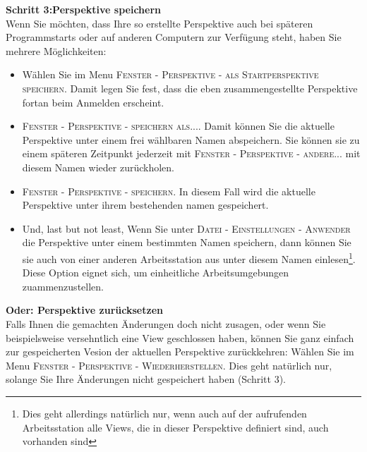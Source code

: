 \bigskip
\textbf{Schritt 3:Perspektive speichern}\\
Wenn Sie möchten, dass Ihre so erstellte Perspektive auch bei späteren Programmstarts oder auf anderen Computern zur Verfügung steht, haben Sie mehrere Möglichkeiten:
\begin{itemize}
\item Wählen Sie im Menu \textsc{Fenster - Perspektive - als Startperspektive speichern}. Damit legen Sie fest, dass die eben zusammengestellte Perspektive fortan beim Anmelden erscheint.
\item \textsc{Fenster - Perspektive - speichern als...}. Damit können Sie die aktuelle Perspektive unter einem frei wählbaren Namen abspeichern. Sie können sie zu einem späteren Zeitpunkt jederzeit mit \textsc{Fenster - Perspektive - andere...} mit diesem Namen wieder zurückholen.
\item \textsc{Fenster - Perspektive - speichern}. In diesem Fall wird die aktuelle Perspektive unter ihrem bestehenden namen gespeichert.
\item Und, last but not least, Wenn Sie unter \textsc{Datei - Einstellungen - Anwender} die Perspektive unter einem bestimmten Namen speichern, dann können Sie sie auch von einer anderen Arbeitsstation aus unter diesem Namen einlesen\footnote{Dies geht allerdings natürlich nur, wenn auch auf der aufrufenden Arbeitsstation alle Views, die in dieser Perspektive definiert sind, auch vorhanden sind}. Diese Option eignet sich, um einheitliche Arbeitsumgebungen zuammenzustellen.
\end{itemize}

\textbf{Oder: Perspektive zurücksetzen}\\
Falls Ihnen die gemachten Änderungen doch nicht zusagen, oder wenn Sie beispielsweise versehntlich eine View geschlossen haben, können Sie ganz einfach zur gespeicherten Vesion der aktuellen Perspektive zurückkehren: Wählen Sie im Menu \textsc{Fenster - Perspektive - Wiederherstellen.} Dies geht natürlich nur, solange Sie Ihre Änderungen nicht gespeichert haben (Schritt 3).


